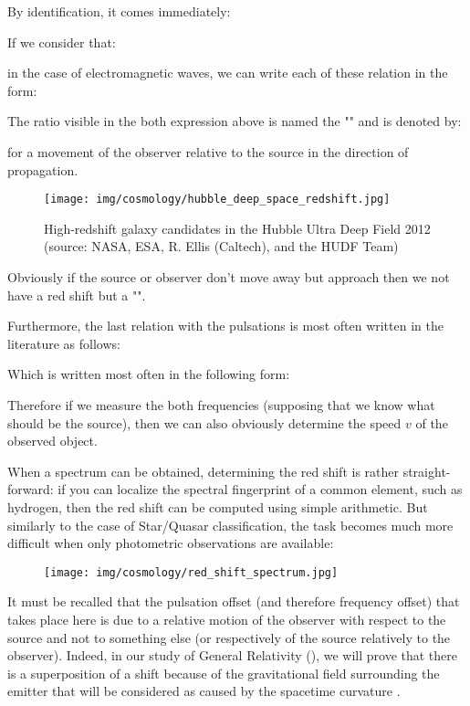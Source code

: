	By identification, it comes immediately:
	
	If we consider that:
	
	in the case of electromagnetic waves, we can write each of these relation in the form:
	
	The ratio visible in the both expression above is named the "" and is denoted by:
	
	for a movement of the observer relative to the source in the direction of propagation.
	\begin{figure}[H]
		\centering
		\texttt{[image: img/cosmology/hubble\_deep\_space\_redshift.jpg]}
		\caption[High-redshift galaxy candidates in the Hubble Ultra Deep Field 2012]{High-redshift galaxy candidates in the Hubble Ultra Deep Field 2012 (source: NASA, ESA, R. Ellis (Caltech), and the HUDF Team)}
	\end{figure}
	Obviously if the source or observer don't move away but approach then we not have a red shift but a "".
	
	Furthermore, the last relation with the pulsations is most often written in the literature as follows:
	
	Which is written most often in the following form:
	
	Therefore if we measure the both frequencies (supposing that we know what should be the source), then we can also obviously determine the speed $v$ of the observed object.
	
	When a spectrum can be obtained, determining the red shift is rather straight-forward: if you can localize the spectral fingerprint of a common element, such as hydrogen, then the red shift can be computed using simple arithmetic. But similarly to the case of Star/Quasar classification, the task becomes much more difficult when only photometric observations are available:
	\begin{figure}[H]
		\centering
		\texttt{[image: img/cosmology/red\_shift\_spectrum.jpg]}
	\end{figure}
	It must be recalled that the pulsation offset (and therefore frequency offset) that takes place here is due to a relative motion of the observer with respect to the source and not to something else (or respectively of the source relatively to the observer). Indeed, in our study of General Relativity (), we will prove that there is a superposition of a shift because of the gravitational field surrounding the emitter that will be considered as caused by the spacetime curvature .


